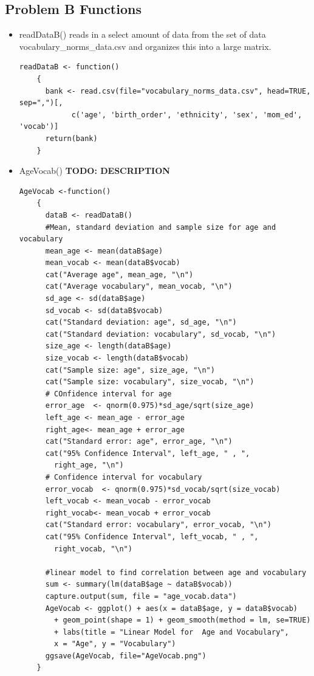 \documentclass[11pt]{article}  %
\begin{document}
\subsection{Problem B Functions}
\label{sec:probbfunc}
\begin{itemize}
    
    \label{sec:RDB}
    \item readDataB() reads in a select amount of data from the set of data vocabulary\_norms\_data.csv and organizes this into a large matrix.
    \begin{lstlisting}[basicstyle=\small]
    readDataB <- function()
    {
      bank <- read.csv(file="vocabulary_norms_data.csv", head=TRUE, sep=",")[,
            c('age', 'birth_order', 'ethnicity', 'sex', 'mom_ed', 'vocab')]
      return(bank)
    }
    \end{lstlisting}
    
    \label{sec:AV}
    \item AgeVocab() \textbf{TODO: DESCRIPTION}
    \begin{lstlisting}[basicstyle=\small]
    AgeVocab <-function()
    {
      dataB <- readDataB()
      #Mean, standard deviation and sample size for age and vocabulary
      mean_age <- mean(dataB$age)
      mean_vocab <- mean(dataB$vocab)
      cat("Average age", mean_age, "\n")
      cat("Average vocabulary", mean_vocab, "\n")
      sd_age <- sd(dataB$age)
      sd_vocab <- sd(dataB$vocab)
      cat("Standard deviation: age", sd_age, "\n")
      cat("Standard deviation: vocabulary", sd_vocab, "\n")
      size_age <- length(dataB$age)
      size_vocab <- length(dataB$vocab)
      cat("Sample size: age", size_age, "\n")
      cat("Sample size: vocabulary", size_vocab, "\n")
      # COnfidence interval for age
      error_age  <- qnorm(0.975)*sd_age/sqrt(size_age) 
      left_age <- mean_age - error_age
      right_age<- mean_age + error_age
      cat("Standard error: age", error_age, "\n")
      cat("95% Confidence Interval", left_age, " , ",
        right_age, "\n")
      # Confidence interval for vocabulary    
      error_vocab  <- qnorm(0.975)*sd_vocab/sqrt(size_vocab)
      left_vocab <- mean_vocab - error_vocab
      right_vocab<- mean_vocab + error_vocab
      cat("Standard error: vocabulary", error_vocab, "\n")
      cat("95% Confidence Interval", left_vocab, " , ",
        right_vocab, "\n")
    
      #linear model to find correlation between age and vocabulary
      sum <- summary(lm(dataB$age ~ dataB$vocab))
      capture.output(sum, file = "age_vocab.data")
      AgeVocab <- ggplot() + aes(x = dataB$age, y = dataB$vocab) 
        + geom_point(shape = 1) + geom_smooth(method = lm, se=TRUE) 
        + labs(title = "Linear Model for  Age and Vocabulary",
        x = "Age", y = "Vocabulary")
      ggsave(AgeVocab, file="AgeVocab.png")
    }
    \end{lstlisting}
    

\end{itemize}
\end{document}
